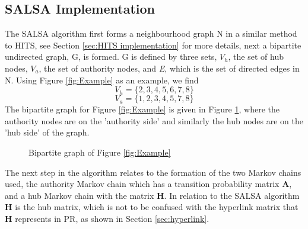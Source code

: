\documentclass[11pt]{report}
\begin{document}
\subsection{SALSA Implementation}\label{sec:SALSA implementation}
The SALSA algorithm first forms a neighbourhood graph N in a similar method to HITS, see Section \ref{sec:HITS implementation} for more details, next a bipartite undirected graph, G, is formed. G is defined by three sets, $V_h$, the set of hub nodes, $V_a$, the set of authority nodes, and \textit{E}, which is the set of directed edges in N. Using Figure \ref{fig:Example} as an example, we find 
\[V_h = \{2,3,4,5,6,7,8\} \]
\[V_a = \{1,2,3,4,5,7,8\} \]
The bipartite graph for Figure \ref{fig:Example} is given in Figure \ref{fig:bipartite}, where the authority nodes are on the 'authority side' and similarly the hub nodes are on the 'hub side' of the graph. 

\begin{figure}[h!]
\centering
{}\caption{Bipartite graph of Figure \ref{fig:Example} } \label{fig:bipartite}
\end{figure}

The next step in the algorithm relates to the formation of the two Markov chains used, the authority Markov chain which has a transition probability matrix \textbf{A}, and a hub Markov chain with the matrix \textbf{H}. In relation to the SALSA algorithm \textbf{H} is the hub matrix, which is not to be confused with the hyperlink matrix that \textbf{H} represents in PR, as shown in Section \ref{sec:hyperlink}.  
\end{document}
